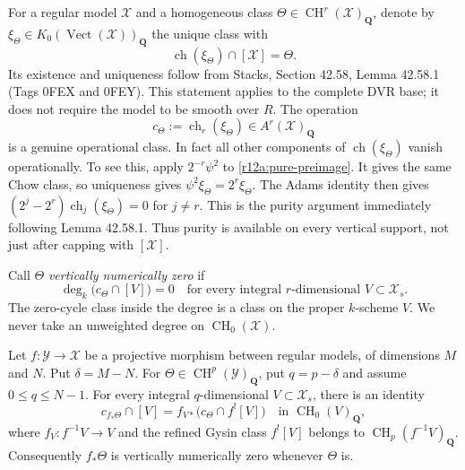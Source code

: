 For a regular model $\mathcal X$ and a homogeneous class
$\Theta\in\operatorname{CH}^r(\mathcal X)_{\mathbf Q}$, denote by
$\xi_\Theta\in K_0(\operatorname{Vect}(\mathcal X))_{\mathbf Q}$
the unique class with
\[
                 \operatorname{ch}(\xi_\Theta)\cap[\mathcal X]
                              =\Theta.
\tag{ND1}\label{r12a:pure-preimage}
\]
Its existence and uniqueness follow from Stacks, Section 42.58,
Lemma 42.58.1 (Tags 0FEX and 0FEY).  This statement applies to the
complete DVR base; it does not require the model to be smooth over $R$.
The operation
\[
                  c_\Theta:=\operatorname{ch}_r(\xi_\Theta)
                          \in A^r(\mathcal X)_{\mathbf Q}
\]
is a genuine operational class.  In fact all other components of
$\operatorname{ch}(\xi_\Theta)$ vanish operationally.  To see this,
apply $2^{-r}\psi^2$ to \eqref{r12a:pure-preimage}.  It gives the same
Chow class, so uniqueness gives
$\psi^2\xi_\Theta=2^r\xi_\Theta$.  The Adams identity then gives
$(2^j-2^r)\operatorname{ch}_j(\xi_\Theta)=0$ for $j\ne r$.
This is the purity argument immediately following Lemma 42.58.1.
Thus purity is available on every vertical support, not just after
capping with $[\mathcal X]$.

Call $\Theta$ \emph{vertically numerically zero} if
\[
          \deg_k\bigl(c_\Theta\cap[V]\bigr)=0
       \quad\text{for every integral }r\text{-dimensional }
                    V\subset\mathcal X_s.
\tag{ND2}\label{r12a:vertical-zero}
\]
The zero-cycle class inside the degree is a class on the proper
$k$-scheme $V$.  We never take an unweighted degree on
$\operatorname{CH}_0(\mathcal X)$.

\begin{lemma}
\label{r12a:supported-pushdown}
Let $f:\mathcal Y\to\mathcal X$ be a projective morphism between
regular models, of dimensions $M$ and $N$.  Put $\delta=M-N$.
For $\Theta\in\operatorname{CH}^p(\mathcal Y)_{\mathbf Q}$, put
$q=p-\delta$ and assume $0\le q\le N-1$.
For every integral $q$-dimensional $V\subset\mathcal X_s$, there is
an identity
\[
 c_{f_*\Theta}\cap[V]
   =f_{V*}\bigl(c_\Theta\cap f^![V]\bigr)
                         \quad\text{in }\operatorname{CH}_0(V)_{\mathbf Q},
\tag{ND3}\label{r12a:supported-projection}
\]
where $f_V:f^{-1}V\to V$ and the refined Gysin class $f^![V]$ belongs
to $\operatorname{CH}_p(f^{-1}V)_{\mathbf Q}$.
Consequently $f_*\Theta$ is vertically numerically zero whenever
$\Theta$ is.
\end{lemma}


